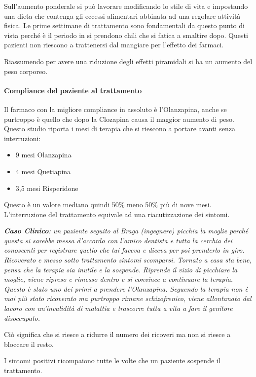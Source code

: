 Sull'aumento ponderale si può lavorare modificando lo stile di vita e
impostando una dieta che contenga gli eccessi alimentari abbinata ad una
regolare attività fisica. Le prime settimane di trattamento sono
fondamentali da questo punto di vista perché è il periodo in si prendono
chili che si fatica a smaltire dopo. Questi pazienti non riescono a
trattenersi dal mangiare per l'effetto dei farmaci.

Riassumendo per avere una riduzione degli effetti piramidali si ha un
aumento del peso corporeo.

\paragraph{Compliance del paziente al trattamento}

Il farmaco con la migliore compliance in assoluto è l'Olanzapina, anche
se purtroppo è quello che dopo la Clozapina causa il maggior aumento di
peso. Questo studio riporta i mesi di terapia che si riescono a portare
avanti senza interruzioni:

\begin{itemize}
\item
  9 mesi Olanzapina
\item
  4 mesi Quetiapina
\item
  3,5 mesi Risperidone
\end{itemize}

Questo è un valore mediano quindi 50\% meno 50\% più di nove mesi.
L'interruzione del trattamento equivale ad una riacutizzazione dei
sintomi.

\emph{\textbf{Caso Clinico}: un paziente seguito al Braga (ingegnere)
picchia la moglie perché questa si sarebbe messa d'accordo con l'amico
dentista e tutta la cerchia dei conoscenti per registrare quello che lui
faceva e diceva per poi prenderlo in giro. Ricoverato e messo sotto
trattamento sintomi scomparsi. Tornato a casa sta bene, pensa che la
terapia sia inutile e la sospende. Riprende il vizio di picchiare la
moglie, viene ripreso e rimesso dentro e si convince a continuare la
terapia. Questo è stato uno dei primi a prendere l'Olanzapina. Seguendo
la terapia non è mai più stato ricoverato ma purtroppo rimane
schizofrenico, viene allontanato dal lavoro con un'invalidità di
malattia e trascorre tutta a vita a fare il genitore disoccupato. }

Ciò significa che si riesce a ridurre il numero dei ricoveri ma non si
riesce a bloccare il resto.

I sintomi positivi ricompaiono tutte le volte che un paziente sospende
il trattamento.

